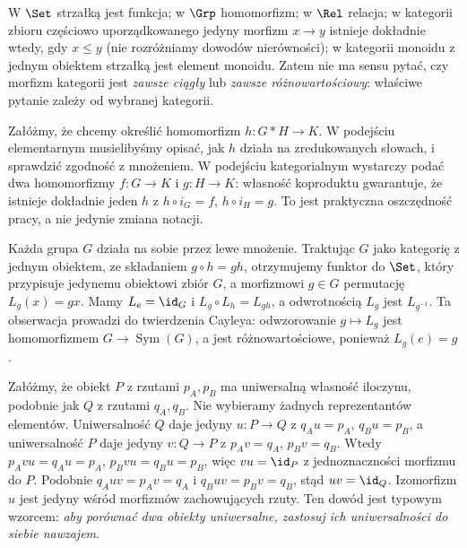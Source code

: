 \begin{przyklad}
W $\Set$ strzałką jest funkcja; w $\Grp$ homomorfizm; w $\Rel$ relacja; w kategorii zbioru częściowo uporządkowanego jedyny morfizm $x\to y$ istnieje dokładnie wtedy, gdy $x\leq y$ (nie rozróżniamy dowodów nierówności); w kategorii monoidu z jednym obiektem strzałką jest element monoidu. Zatem nie ma sensu pytać, czy morfizm kategorii jest \emph{zawsze ciągły} lub \emph{zawsze różnowartościowy}: właściwe pytanie zależy od wybranej kategorii.
\end{przyklad}

\begin{przyklad}
Załóżmy, że chcemy określić homomorfizm $h:G*H\to K$. W podejściu elementarnym musielibyśmy opisać, jak $h$ działa na zredukowanych słowach, i sprawdzić zgodność z mnożeniem. W podejściu kategorialnym wystarczy podać dwa homomorfizmy $f:G\to K$ i $g:H\to K$: własność koproduktu gwarantuje, że istnieje dokładnie jeden $h$ z $h\circ i_G=f$, $h\circ i_H=g$. To jest praktyczna oszczędność pracy, a nie jedynie zmiana notacji.
\end{przyklad}

\begin{przyklad}
Każda grupa $G$ działa na sobie przez lewe mnożenie. Traktując $G$ jako kategorię z jednym obiektem, ze składaniem $g\circ h=gh$, otrzymujemy funktor do $\Set$, który przypisuje jedynemu obiektowi zbiór $G$, a morfizmowi $g\in G$ permutację $L_g(x)=gx$. Mamy $L_e=\id_G$ i $L_g\circ L_h=L_{gh}$, a odwrotnością $L_g$ jest $L_{g^{-1}}$. Ta obserwacja prowadzi do twierdzenia Cayleya: odwzorowanie $g\mapsto L_g$ jest homomorfizmem $G\to\operatorname{Sym}(G)$, a jest różnowartościowe, ponieważ $L_g(e)=g$.
\end{przyklad}


\begin{przyklad}
Załóżmy, że obiekt $P$ z rzutami $p_A,p_B$ ma uniwersalną własność iloczynu, podobnie jak $Q$ z rzutami $q_A,q_B$. Nie wybieramy żadnych reprezentantów elementów. Uniwersalność $Q$ daje jedyny $u:P\to Q$ z $q_Au=p_A$, $q_Bu=p_B$, a uniwersalność $P$ daje jedyny $v:Q\to P$ z $p_Av=q_A$, $p_Bv=q_B$. Wtedy $p_Avu=q_Au=p_A$, $p_Bvu=q_Bu=p_B$, więc $vu=\id_P$ z jednoznaczności morfizmu do $P$. Podobnie $q_Auv=p_Av=q_A$ i $q_Buv=p_Bv=q_B$, stąd $uv=\id_Q$. Izomorfizm $u$ jest jedyny wśród morfizmów zachowujących rzuty. Ten dowód jest typowym wzorcem: \emph{aby porównać dwa obiekty uniwersalne, zastosuj ich uniwersalności do siebie nawzajem}.
\end{przyklad}

